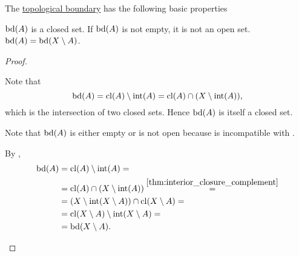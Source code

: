 \begin{proposition}\label{thm:topological_boundary_properties}
  The \hyperref[def:topological_boundary]{topological boundary} has the following basic properties
  \begin{propenum}
     \( \operatorname{bd}(A) \) is a closed set.
     If \( \operatorname{bd}(A) \) is not empty, it is not an open set.
     \( \operatorname{bd}(A) = \operatorname{bd}(X \setminus A) \).
  \end{propenum}
\end{proposition}
\begin{proof}\mbox{}
  \begin{description}
     Note that
    \begin{equation*}
      \operatorname{bd}(A) = \operatorname{cl}(A) \setminus \operatorname{int}(A) = \operatorname{cl}(A) \cap (X \setminus \operatorname{int}(A)),
    \end{equation*}
    which is the intersection of two closed sets. Hence \( \operatorname{bd}(A) \) is itself a closed set.

     Note that \( \operatorname{bd}(A) \) is either empty or is not open because  is incompatible with .

     By ,
    \begin{align*}
      \operatorname{bd}(A)
      &=
      \operatorname{cl}(A) \setminus \operatorname{int}(A)
      = \\ &=
      \operatorname{cl}(A) \cap (X \setminus \operatorname{int}(A))
      \overset {\ref{thm:interior_closure_complement}} = \\ &=
      (X \setminus \operatorname{int}(X \setminus A)) \cap \operatorname{cl}(X \setminus A)
      = \\ &=
      \operatorname{cl}(X \setminus A) \setminus \operatorname{int}(X \setminus A)
      = \\ &=
      \operatorname{bd}(X \setminus A).
    \end{align*}
  \end{description}
\end{proof}


